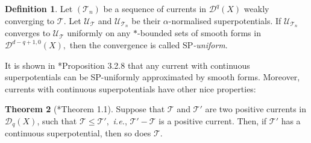 \documentclass[11pt]{amsart}
\theoremstyle{definition}
\newtheorem{theorem}{Theorem}[section]
\newtheorem{definition}[theorem]{Definition}
\newcommand{\lto}{\longrightarrow}
\newcommand{\sD}{\mathscr{D}}
\newcommand{\sU}{\mathscr{U}}
\newcommand{\sT}{\mathscr{T}}
\newcommand{\sS}{\mathscr{S}}
\begin{document}

\begin{definition}
    Let $(\sT_n)$ be a sequence of currents in $\sD^q(X)$ weakly converging to $\sT.$ Let $\sU_{\sT}$ and $\sU_{\sT_n}$ be their $\alpha$-normalised superpotentials. If $\sU_{\sT_n}$ converges to $\sU_{\sT}$ uniformly on any $*$-bounded sets of smooth forms in $\sD^{d-q+1,0}(X),$ then the convergence is called \emph{$\textrm{SP}$-uniform}.
\end{definition}
It is shown in \cite{Dinh-Sibony:Kahler}*{Proposition 3.2.8} that any current with continuous superpotentials can be SP-uniformly approximated by smooth forms. Moreover, currents with continuous superpotentials have other nice properties:

\begin{theorem}[\cite{Dinh-Nguyen-Vu}*{Theorem 1.1}]\label{thm:superpot-ineq}
  Suppose that $\sT$ and $\sT'$ are two positive currents in $\sD_q(X)$, such that $\sT \leq \sT',$ \textit{i.e.}, $\sT' -\sT$ is a positive current. Then, if $\sT'$ has a continuous superpotential, then so does $\sT$.
\end{theorem}

    
\end{document}
